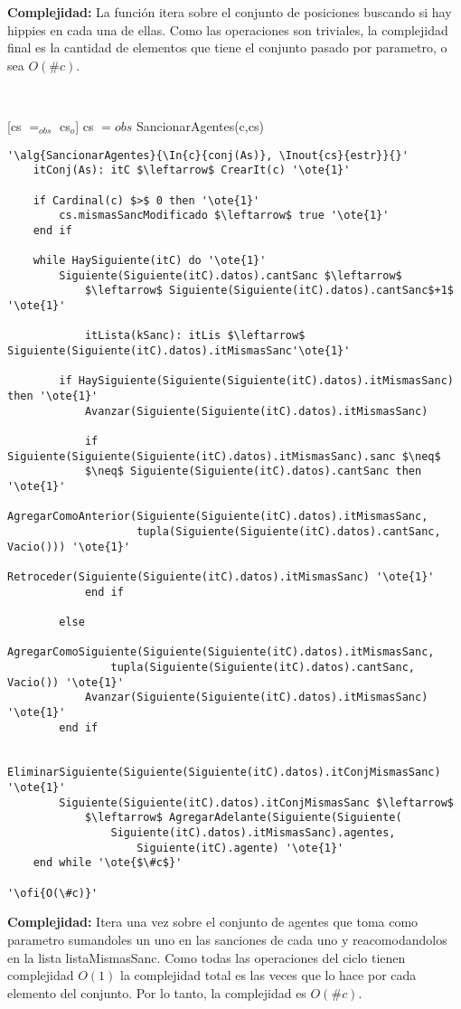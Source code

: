 \textbf{Complejidad:} La función itera sobre el conjunto de posiciones buscando si hay hippies en cada una de ellas. Como las operaciones son triviales, la complejidad final es la cantidad de elementos que tiene el conjunto pasado por parametro, o sea $O(\#c)$.

~


[cs $=_{obs}$ cs$_o$]
{cs $={obs}$ SancionarAgentes(c,cs)}

\begin{lstlisting}[mathescape]
'\alg{SancionarAgentes}{\In{c}{conj(As)}, \Inout{cs}{estr}}{}'
	itConj(As): itC $\leftarrow$ CrearIt(c) '\ote{1}'

	if Cardinal(c) $>$ 0 then '\ote{1}'
		cs.mismasSancModificado $\leftarrow$ true '\ote{1}'
	end if

	while HaySiguiente(itC) do '\ote{1}'
		Siguiente(Siguiente(itC).datos).cantSanc $\leftarrow$
			$\leftarrow$ Siguiente(Siguiente(itC).datos).cantSanc$+1$ '\ote{1}'

			itLista(kSanc): itLis $\leftarrow$ Siguiente(Siguiente(itC).datos).itMismasSanc'\ote{1}'

		if HaySiguiente(Siguiente(Siguiente(itC).datos).itMismasSanc) then '\ote{1}'
			Avanzar(Siguiente(Siguiente(itC).datos).itMismasSanc)

			if Siguiente(Siguiente(Siguiente(itC).datos).itMismasSanc).sanc $\neq$
			$\neq$ Siguiente(Siguiente(itC).datos).cantSanc then '\ote{1}'
				AgregarComoAnterior(Siguiente(Siguiente(itC).datos).itMismasSanc,
					tupla(Siguiente(Siguiente(itC).datos).cantSanc, Vacio())) '\ote{1}'
				Retroceder(Siguiente(Siguiente(itC).datos).itMismasSanc) '\ote{1}'
			end if

		else
			AgregarComoSiguiente(Siguiente(Siguiente(itC).datos).itMismasSanc,
				tupla(Siguiente(Siguiente(itC).datos).cantSanc, Vacio()) '\ote{1}'
			Avanzar(Siguiente(Siguiente(itC).datos).itMismasSanc) '\ote{1}'
		end if

		EliminarSiguiente(Siguiente(Siguiente(itC).datos).itConjMismasSanc) '\ote{1}'
		Siguiente(Siguiente(itC).datos).itConjMismasSanc $\leftarrow$
			$\leftarrow$ AgregarAdelante(Siguiente(Siguiente(
				Siguiente(itC).datos).itMismasSanc).agentes,
					Siguiente(itC).agente) '\ote{1}'
	end while '\ote{$\#c$}'

'\ofi{O(\#c)}'
\end{lstlisting}

\textbf{Complejidad:} Itera una vez sobre el conjunto de agentes que toma como parametro sumandoles un uno en las sanciones de cada uno y reacomodandolos en la lista listaMismasSanc. Como todas las operaciones del ciclo tienen complejidad $O(1)$ la complejidad total es las veces que lo hace por cada elemento del conjunto. Por lo tanto, la complejidad es $O(\#c)$.

